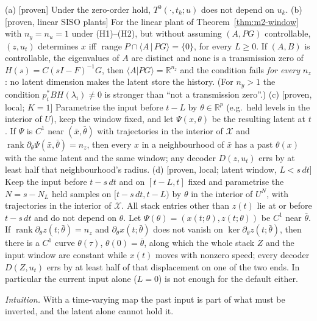 \begin{proposition}\label{prop:m2-current}
(a) [proven] Under the zero-order hold, $T^0(\cdot,t_k;u)$ does not depend on $u_k$.
(b) [proven, linear SISO plants] For the linear plant of Theorem~\ref{thm:m2-window} with $n_y=n_u=1$ under (H1)--(H2), but without assuming $(A,PG)$
controllable,
$(z,u_t)$ determines $x$ iff $\operatorname{range}P\cap\langle A\,|\,PG\rangle=\{0\}$, for every $L\ge0$. If $(A,B)$
is controllable, the eigenvalues of $A$ are distinct and none is a transmission zero of $H(s)=C(sI-F)^{-1}G$, then
$\langle A|PG\rangle=\mathbb R^{n_z}$ and the condition fails \emph{for every} $n_z$: no latent dimension makes the
latent store the history. (For $n_y>1$ the condition $p_i^*BH(\lambda_i)\ne0$ is stronger than ``not a transmission
zero''.)
(c) [proven, local; $K=1$] Parametrise the input before $t-L$ by $\theta\in\mathbb R^p$ (e.g.\ held levels in the
interior of $U$), keep the window fixed, and let $\Psi(x,\theta)$ be the resulting latent at $t$. If $\Psi$ is
$C^1$ near $(\bar x,\bar\theta)$ with trajectories in the interior of $\mathcal X$ and
$\operatorname{rank}\partial_\theta\Psi(\bar x,\bar\theta)=n_z$, then every $x$ in a neighbourhood of $\bar x$ has a past
$\theta(x)$ with the same latent and the same window; any decoder $D(z,u_t)$ errs by at least half that
neighbourhood's radius.
(d)  [proven, local; latent window, $L<s\,dt$] Keep the input before $t-s\,dt$ and on $[t-L,t]$ fixed and
parametrise the $N=s-N_L$ held samples on $[t-s\,dt,t-L)$ by $\theta$ in the interior of $U^N$, with trajectories in the
interior of $\mathcal X$. All stack entries other than $z(t)$ lie at or before $t-s\,dt$ and do not depend on $\theta$. Let
$\Psi(\theta)=(x(t;\theta),z(t;\theta))$ be $C^1$ near $\bar\theta$. If $\operatorname{rank}\partial_\theta z(t;\bar\theta)=n_z$
and $\partial_\theta x(t;\bar\theta)$ does not vanish on $\ker\partial_\theta z(t;\bar\theta)$, then there is a $C^1$ curve
$\theta(\tau)$, $\theta(0)=\bar\theta$, along which the whole stack $Z$ and the input window are constant while $x(t)$ moves
with nonzero speed; every decoder $D(Z,u_t)$ errs by at least half of that displacement on one of the two ends.
In particular the current input alone ($L=0$) is not enough for the default either.
\end{proposition}
\emph{Intuition.} With a time-varying map the past input is part of what must be inverted, and the latent
alone cannot hold it.
